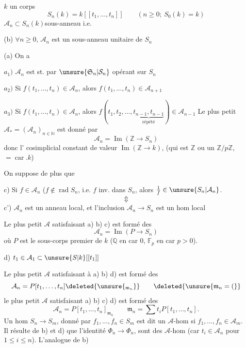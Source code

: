 $k$ un  corps
\[
S_n(k)=k[[t_1,\ldots,t_n]]\qquad(n\ge0;\ S_0(k)=k)
\]
$\mathcal A_n\subset S_n(k)$\qquad sous-anneau  i.e.

(b) $\forall n\ge0$, $\mathcal A_n$ est un sous-anneau unitaire de $S_n$

(a) On a

$a_1)$ $\mathcal A_n$ est st. par $\unsure{\mathfrak S_n|\mathcal S_n}$ opérant sur $S_n$

$a_2)$ Si $f(t_1,\ldots,t_n)\in\mathcal A_n$, alors $f(t_1,\ldots,t_n)\in\mathcal A_{n+1}$

$a_3)$ Si $f(t_1,\ldots,t_n)\in\mathcal A_n$, alors $f(t_1,t_2,\ldots,\underbrace{t_{n-1},t_{n-1}}_{\text{répété}})\in\mathcal A_{n-1}$
Le plus petit $\mathcal A_*=(\mathcal A_n)_{n\in\mathbb N}$  est donné par 
\[
\mathcal A_n=\operatorname{Im}(\mathbb Z\longrightarrow S_n)
\]
donc l' cosimplicial constant de valeur $\operatorname{Im}(\mathbb Z\to k)$,
(qui est $\mathbb Z$ ou un $\mathbb Z/p\mathbb Z$,  $=\operatorname{car}.k$)

On suppose de plus que

c) Si $f\in\mathcal A_n$ ($f\notin\operatorname{rad}S_n$, i.e. $f$ inv. dans $S_n$, alors $\frac1f\in\unsure{S_n|\mathcal A_n}$.
\[
\Updownarrow
\]
c') $\mathcal A_n$ est un anneau local, et l'inclusion $\mathcal A_n\to S_n$ est un hom local

Le plus petit $\mathcal A$ satisfaisant a) b) c) est formé des
\[
\mathcal A_n=\operatorname{Im}(P\longrightarrow S_n)
\]
où $P$ est le sous-corps premier de $k$ ($\mathbb Q$ en car $0$, $\mathbb F_p$ en car $p>0$).

d) $t_1\in\mathcal A_1\subset\unsure{S|k}[[t_1]]$

Le plus petit $\mathcal A$ satisfaisant à a) b) d)  est formé des
\[
\mathcal A_n=P[t_1,\ldots,t_n]\deleted{\unsure{_{\mathfrak m_n}}}\qquad\deleted{\unsure{\mathfrak m_n=(}}
\]
le plus petit $\mathcal A$ satisfaisant a) b) c) d) est formé des
\[
\mathcal A_n=P[t_1,\ldots,t_n]_{\mathfrak m_n}\qquad\mathfrak m_n=\sum t_i P[t_1,\ldots,t_n].
\]
\deleted{\unsure{$\Phi$}}
Un hom $S_n\longrightarrow S_m$, donné par $f_1,\ldots,f_n\in S_m$ est dit un $\mathcal A$-hom si $f_1,\ldots,f_n\in\mathcal A_m$. Il résulte de b) et d) que l'identité $\Phi_n\longrightarrow\Phi_n$,  sont des $\mathcal A$-hom (car $t_i\in\mathcal A_n$ pour $1\le i\le n$). L'analogue de b)

